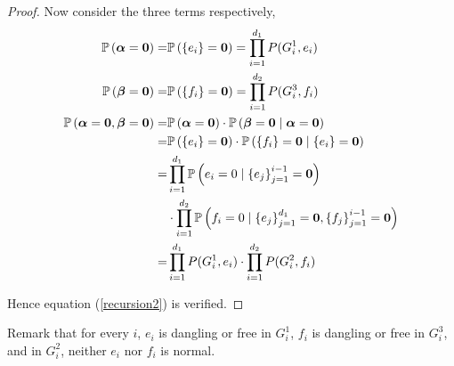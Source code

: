 \begin{proof}
Now consider the three terms respectively,
	\begin{align*}
        \mathbb{P}\left( \boldsymbol\alpha = \mathbf{0}\right) =& \mathbb{P} \left( \left\{e_i\right\} = \mathbf{0}\right) =	\prod_{i=1}^{d_1} P(G_i^1, e_i) \\
        \mathbb{P}\left( \boldsymbol\beta = \mathbf{0}\right) =& \mathbb{P} \left( \left\{f_i\right\} = \mathbf{0}\right) =	\prod_{i=1}^{d_2} P(G_i^3, f_i) \\
        \mathbb{P}\left( \boldsymbol\alpha = \mathbf{0}, \boldsymbol\beta = \mathbf{0} \right) =&  \mathbb{P} \left( \boldsymbol\alpha = \mathbf{0} \right) \cdot \mathbb{P}\left( \boldsymbol\beta = \mathbf{0} \mid \boldsymbol\alpha = \mathbf{0} \right) \\
        =&  \mathbb{P} \left( \left\{e_i\right\} = \mathbf{0}\right) \cdot \mathbb{P} \left( \left\{f_i\right\} = \mathbf{0} \mid \left\{e_i\right\} = \mathbf{0} \right) \\
        =& \prod_{i=1}^{d_1} \mathbb{P} \left( e_i = 0 \mid \left\{e_j\right\}_{j=1}^{i-1} = \mathbf{0} \right) \\
         &\cdot \prod_{i=1}^{d_2} \mathbb{P} \left( f_i = 0 \mid \left\{e_j\right\}_{j=1}^{d_1} = \mathbf{0},\left\{f_j\right\}_{j=1}^{i-1} = \mathbf{0} \right) \\
        =& \prod_{i=1}^{d_1} P(G_i^1, e_i) \cdot \prod_{i=1}^{d_2} P(G_i^2, f_i)
	\end{align*}

	Hence equation (\ref{recursion2}) is verified.
\end{proof}

Remark that for every $i$, $e_i$ is dangling or free in $G_i^1$, $f_i$ is dangling or free in $G_i^3$, and in $G_i^2$, neither $e_i$ nor $f_i$ is normal.

